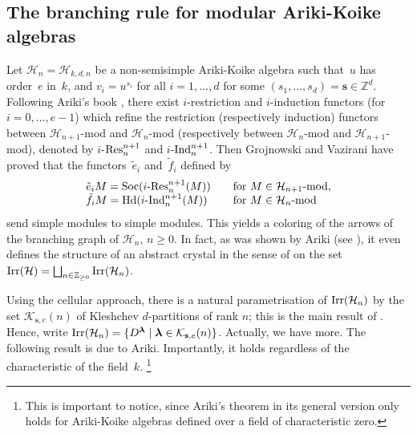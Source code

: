 \documentclass[twoside,12pt]{amsart}
\theoremstyle{plain}
\begin{document}
\subsection{The branching rule for modular Ariki-Koike algebras}
\label{branchingAK}

Let ${\mathcal{H}}_n={\mathcal{H}}_{k,d,n}$ be a non-semisimple Ariki-Koike algebra such that~$u$ 
has order~$e$ in~$k$, and $v_i=u^{s_i}$ for all $i=1,\dots,d$ for some 
$(s_1,\dots,s_d)={\mathbf{s}}\in{\mathbb{Z}}^d$. Following Ariki's book 
\cite[Section 13.6]{Ariki2002}, there exist $i$-restriction and $i$-induction 
functors (for $i=0,\dots,e-1$) which refine the restriction 
(respectively induction) functors between ${\mathcal{H}}_{n+1}$-mod and ${\mathcal{H}}_n$-mod
(respectively between ${\mathcal{H}}_{n}$-mod and ${\mathcal{H}}_{n+1}$-mod),
denoted by $i$-${\mbox{\rm Res}}_n^{n+1}$ and $i$-${\mbox{\rm Ind}}_n^{n+1}$.
Then Grojnowski and Vazirani \cite[Theorem B]{GrojnowskiVazirani2001} 
have proved that the functors~${\tilde{e}}_i$ and~${\tilde{f}}_i$ defined by
$$\begin{array}{ll} 
{\tilde{e}}_i M = \text{Soc} (i\text{-}{\mbox{\rm Res}}_n^{n+1} (M)) & \text{\quad for } M\in {\mathcal{H}}_{n+1}\mbox{\rm -mod}, \\
{\tilde{f}}_i M = \text{Hd} (i\text{-}{\mbox{\rm Ind}}_n^{n+1} (M)) & \text{\quad for } M\in {\mathcal{H}}_{n}\mbox{\rm -mod}
\end{array}$$
send simple modules to simple modules. This yields a coloring of the arrows of 
the branching graph of ${\mathcal{H}}_n$, $n \geq 0$. In fact, as was shown by Ariki (see 
\cite[Theorem 4.1]{Ariki2007}), it even defines the structure of an abstract crystal 
in the sense of \cite[Section 7.2]{Kashiwara1995}
on the set ${\text{\rm Irr}}({\mathcal{H}})=\bigsqcup_{n\in{\mathbb{Z}}_{\geq0}}{\text{\rm Irr}}({\mathcal{H}}_n)$. 

Using the cellular approach, there is a natural parametrisation of ${\text{\rm Irr}}({\mathcal{H}}_n)$ 
by the set ${\mathcal{K}}_{{\mathbf{s}},e}(n)$ of Kleshchev $d$-partitions of rank $n$; this is the 
main result of \cite{Ariki2001}. Hence, write ${\text{\rm Irr}}({\mathcal{H}}_n)=\{ D^{\boldsymbol{\lambda}} \mid  
{\boldsymbol{\lambda}}\in{\mathcal{K}}_{{\mathbf{s}},e}(n) \}$. Actually, we have more. The following result is 
due to Ariki. Importantly, it holds regardless of the characteristic of the 
field~$k$. 
\footnote{This is important to notice, since Ariki's theorem in its general 
version only holds for Ariki-Koike algebras defined over a field of 
characteristic zero.}
\end{document}
